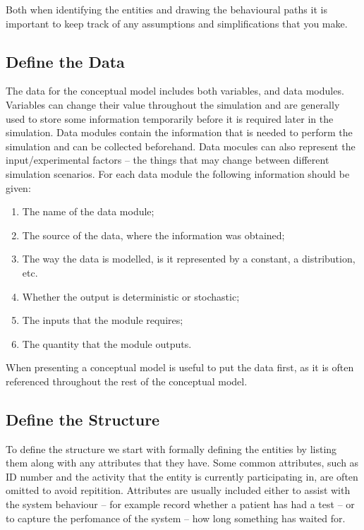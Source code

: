 \documentclass[
  10pt,
  a4paperpaper,
  DIV=11,
  numbers=noendperiod,
  oneside]{scrreprt}
\providecommand{\tightlist}{%
  \setlength{\itemsep}{0pt}\setlength{\parskip}{0pt}}\usepackage{longtable,booktabs,array}
\begin{document}
Both when identifying the entities and drawing the behavioural paths it
is important to keep track of any assumptions and simplifications that
you make.

\subsection{Define the Data}\label{define-the-data}

The data for the conceptual model includes both variables, and data
modules. Variables can change their value throughout the simulation and
are generally used to store some information temporarily before it is
required later in the simulation. Data modules contain the information
that is needed to perform the simulation and can be collected
beforehand. Data mocules can also represent the input/experimental
factors -- the things that may change between different simulation
scenarios. For each data module the following information should be
given:

\begin{enumerate}
\def\labelenumi{\arabic{enumi}.}
\tightlist
\item
  The name of the data module;
\item
  The source of the data, where the information was obtained;
\item
  The way the data is modelled, is it represented by a constant, a
  distribution, etc.
\item
  Whether the output is deterministic or stochastic;
\item
  The inputs that the module requires;
\item
  The quantity that the module outputs.
\end{enumerate}

When presenting a conceptual model is useful to put the data first, as
it is often referenced throughout the rest of the conceptual model.

\subsection{Define the Structure}\label{define-the-structure}

To define the structure we start with formally defining the entities by
listing them along with any attributes that they have. Some common
attributes, such as ID number and the activity that the entity is
currently participating in, are often omitted to avoid repitition.
Attributes are usually included either to assist with the system
behaviour -- for example record whether a patient has had a test -- or
to capture the perfomance of the system -- how long something has waited
for.
\end{document}
